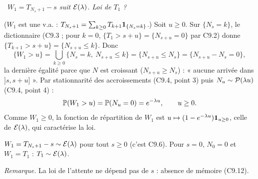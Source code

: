 \documentclass[11pt,a4paper]{article}
\newcommand{\question}[2]{\par\medskip\noindent\textbf{#1}~\textit{#2}\par\smallskip}
\begin{document}
\begin{exo}
\question{}{$W_1=T_{N_s+1}-s$ suit $\mathcal{E}(\lambda)$. Loi de $T_1$ ?}
($W_1$ est une v.a. : $T_{N_s+1}=\sum_{k\ge0}T_{k+1}\mathbf{1}_{\{N_s=k\}}$.) Soit $u\ge0$. Sur $\{N_s=k\}$, le dictionnaire (C9.3 ; pour $k=0$, $\{T_1>s+u\}=\{N_{s+u}=0\}$ par C9.2) donne
$\{T_{k+1}>s+u\}=\{N_{s+u}\le k\}$. Donc
\[\{W_1>u\}=\bigcup_{k\ge0}\{N_s=k,\ N_{s+u}\le k\}=\{N_{s+u}\le N_s\}=\{N_{s+u}-N_s=0\},\]
la dernière égalité parce que $N$ est croissant ($N_{s+u}\ge N_s$) : « aucune arrivée dans $]s,s+u]$ ». Par stationnarité des accroissements
(C9.4, point 3) puis $N_u\sim\mathcal{P}(\lambda u)$ (C9.4, point 4) :
\[\mathbb{P}(W_1>u)=\mathbb{P}(N_u=0)=e^{-\lambda u},\qquad u\ge0.\]
Comme $W_1\ge0$, la fonction de répartition de $W_1$ est $u\mapsto(1-e^{-\lambda u})\mathbf{1}_{u\ge0}$, celle de $\mathcal{E}(\lambda)$, qui
caractérise la loi.
\begin{resultat}$W_1=T_{N_s+1}-s\sim\mathcal{E}(\lambda)$ pour tout $s\ge0$ (c'est C9.6). Pour $s=0$, $N_0=0$ et $W_1=T_1$ : $T_1\sim\mathcal{E}(\lambda)$.\end{resultat}
\textit{Remarque.} La loi de l'attente ne dépend pas de $s$ : absence de mémoire (C9.12).
\end{exo}
\end{document}
